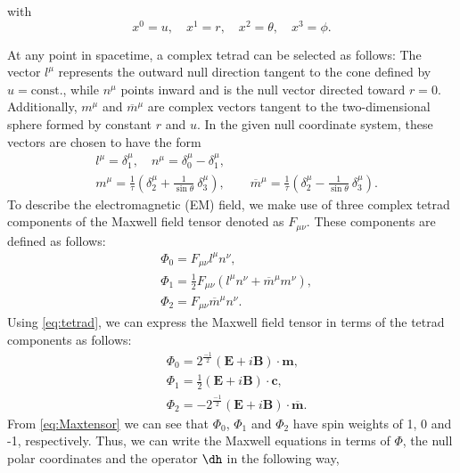with 
\begin{equation}
  x^0 = u, \quad x^1 = r, \quad x^2 = \theta, \quad x^3 = \phi.
\end{equation}

At any point in spacetime, a complex tetrad can be selected as follows: The vector $l^{\mu}$ represents the outward null direction tangent to the cone defined by $u = \text{const.}$, while $n^{\mu}$ points inward and is the null vector directed toward $r = 0$. Additionally, $m^{\mu}$ and $\overline{m}^{\mu}$ are complex vectors tangent to the two-dimensional sphere formed by constant $r$ and $u$. In the given null coordinate system, these vectors are chosen to have the form 
\begin{align}\label{eq:tetrad}
  & l^{\mu} = \delta_{1}^{\mu}, \quad n^{\mu} = \delta_{0}^{\mu} - \delta_{1}^{\mu}, \nonumber \\
  & m^{\mu} = \displaystyle\frac{1}{\tau}\left(\delta_{2}^{\mu} + \displaystyle\frac{1}{\sin\theta}\ \delta_{3}^{\mu}\right), \qquad \overline{m}^{\mu} = \displaystyle\frac{1}{\tau}\left(\delta_{2}^{\mu} - \displaystyle\frac{1}{\sin\theta}\ \delta_{3}^{\mu}\right).
\end{align}
To describe the electromagnetic (EM) field, we make use of three complex tetrad components of the Maxwell field tensor denoted as $F_{\mu \nu}$. These components are defined as follows:
\begin{align}\label{eq:Maxtensor}
  & \Phi_{0} = F_{\mu \nu}l^{\mu}n^{\nu}, \nonumber \\
  & \Phi_{1} = \frac{1}{2} F_{\mu \nu}(l^{\mu}n^{\nu} + \overline{m}^{\mu}m^{\nu}), \nonumber \\
  & \Phi_{2} = F_{\mu \nu}\overline{m}^{\mu}n^{\nu}.
\end{align}
Using \eqref{eq:tetrad}, we can express the Maxwell field tensor in terms of the tetrad components as follows:
\begin{align}\label{eq:Maxtensorintetrad}
  & \Phi_{0} = 2^{\frac{-1}{2}}(\boldsymbol{E} + i\boldsymbol{B})\cdot \boldsymbol{m}, \nonumber \\
  & \Phi_{1} = \frac{1}{2}(\boldsymbol{E} + i\boldsymbol{B})\cdot \boldsymbol{c} , \nonumber \\
  & \Phi_{2} = -2^{\frac{-1}{2}}(\boldsymbol{E} + i\boldsymbol{B})\cdot \boldsymbol{\overline{m}}.
\end{align}
From \eqref{eq:Maxtensor} we can see that $\Phi_{0}$, $\Phi_{1}$ and $\Phi_{2}$ have spin weights of 1, 0 and -1, respectively. Thus, we can write the Maxwell equations in terms of $\Phi$, the null polar coordinates and the operator $\dh$ in the following way,
